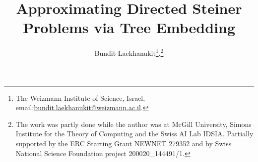 \documentclass[11pt]{article}
\theoremstyle{definition}
\theoremstyle{remark}
\begin{document}
\title{Approximating Directed Steiner Problems via Tree Embedding}

\author{Bundit Laekhanukit\thanks{
The Weizmann Institute of Science, Israel,
email:\url{bundit.laekhanukit@weizmann.ac.il}.
}.\footnote{
The work was partly done while the author was at 
McGill University, Simons Institute for the Theory of Computing
and the Swiss AI Lab IDSIA.
Partially supported by the ERC Starting Grant NEWNET 279352 and
by Swiss National Science Foundation project 200020\_144491/1.
}}






















\maketitle
\end{document}
